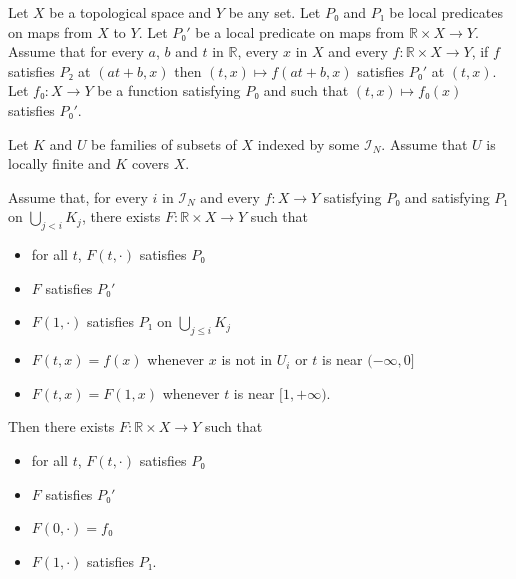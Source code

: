 \documentclass[10pt,a4paper]{article}
\newcommand{\co}{\!:}
\newcommand{\IT}[1]{\mathcal{I}_{#1}}
\newcommand{\lean}[1]{}
\newcommand{\leanok}{}
\begin{document}
\begin{lemma}
  \label{lem:inductive_htpy_construction}\lean{inductive_htpy_construction}\leanok
  Let $X$ be a topological space and $Y$ be any set.
  Let $P₀$ and $P₁$ be local predicates on maps from $X$ to $Y$.
  Let $P₀'$ be a local predicate on maps from $ℝ × X → Y$. Assume that
  for every $a$, $b$ and $t$ in $ℝ$, every $x$ in $X$ and every
  $f \co ℝ × X → Y$, if $f$ satisfies $P₂$ at $(at + b, x)$ then
  $(t, x) ↦ f(at+b, x)$ satisfies $P₀'$ at $(t, x)$. Let $f₀ \co X → Y$ be a function
  satisfying $P₀$ and such that $(t, x) ↦ f₀(x)$ satisfies $P₀'$.

  Let $K$ and $U$ be families of subsets of $X$ indexed by some $\IT{N}$.
  Assume that $U$ is locally finite and $K$ covers $X$.

  Assume that, for every $i$ in $\IT{N}$ and every $f \co X → Y$ satisfying $P₀$ and
  satisfying $P₁$ on $\bigcup_{j < i} K_j$, there exists $F \co ℝ × X → Y$ such that
  \begin{itemize}
    \item for all $t$, $F(t, \cdot)$ satisfies $P₀$
    \item $F$ satisfies $P₀'$
    \item $F(1, \cdot)$ satisfies $P₁$ on $\bigcup_{j ≤ i} K_j$
    \item $F(t, x) = f(x)$ whenever $x$ is not in $U_i$ or $t$ is near $(-∞, 0]$
    \item $F(t, x) = F(1, x)$ whenever $t$ is near $[1, +∞)$.
  \end{itemize}
  Then there exists $F \co ℝ × X → Y$ such that
  \begin{itemize}
    \item for all $t$, $F(t, \cdot)$ satisfies $P₀$
    \item $F$ satisfies $P₀'$
    \item $F(0, \cdot) = f₀$
    \item $F(1, \cdot)$ satisfies $P₁$.
  \end{itemize}
\end{lemma}
\end{document}
